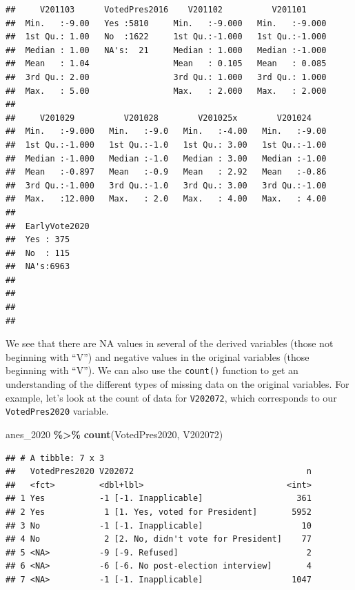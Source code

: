 \documentclass[
]{krantz}
\makeatletter
\newenvironment{Shaded}{\begin{snugshade}}{\end{snugshade}}
\newcommand{\FunctionTok}[1]{\textcolor[rgb]{0.27,0.27,0.27}{\textbf{#1}}}
\newcommand{\NormalTok}[1]{#1}
\newcommand{\SpecialCharTok}[1]{\textcolor[rgb]{0.43,0.43,0.43}{\textbf{#1}}}
\newenvironment{kframe}{%
\medskip{}
\setlength{\fboxsep}{.8em}
 \def\at@end@of@kframe{}%
 \ifinner\ifhmode%
  \def\at@end@of@kframe{\end{minipage}}%
  \begin{minipage}{\columnwidth}%
 \fi\fi%
 \def\FrameCommand##1{\hskip\@totalleftmargin \hskip-\fboxsep
 \colorbox{shadecolor}{##1}\hskip-\fboxsep
     \hskip-\linewidth \hskip-\@totalleftmargin \hskip\columnwidth}%
 \MakeFramed {\advance\hsize-\width
   \@totalleftmargin\z@ \linewidth\hsize
   \@setminipage}}%
 {\par\unskip\endMakeFramed%
 \at@end@of@kframe}
\renewenvironment{Shaded}{\begin{kframe}}{\end{kframe}}
\makeatother
\begin{document}
\begin{verbatim}
##     V201103      VotedPres2016    V201102          V201101      
##  Min.   :-9.00   Yes :5810     Min.   :-9.000   Min.   :-9.000  
##  1st Qu.: 1.00   No  :1622     1st Qu.:-1.000   1st Qu.:-1.000  
##  Median : 1.00   NA's:  21     Median : 1.000   Median :-1.000  
##  Mean   : 1.04                 Mean   : 0.105   Mean   : 0.085  
##  3rd Qu.: 2.00                 3rd Qu.: 1.000   3rd Qu.: 1.000  
##  Max.   : 5.00                 Max.   : 2.000   Max.   : 2.000  
##                                                                 
##     V201029          V201028        V201025x        V201024     
##  Min.   :-9.000   Min.   :-9.0   Min.   :-4.00   Min.   :-9.00  
##  1st Qu.:-1.000   1st Qu.:-1.0   1st Qu.: 3.00   1st Qu.:-1.00  
##  Median :-1.000   Median :-1.0   Median : 3.00   Median :-1.00  
##  Mean   :-0.897   Mean   :-0.9   Mean   : 2.92   Mean   :-0.86  
##  3rd Qu.:-1.000   3rd Qu.:-1.0   3rd Qu.: 3.00   3rd Qu.:-1.00  
##  Max.   :12.000   Max.   : 2.0   Max.   : 4.00   Max.   : 4.00  
##                                                                 
##  EarlyVote2020
##  Yes : 375    
##  No  : 115    
##  NA's:6963    
##               
##               
##               
## 
\end{verbatim}

We see that there are NA values in several of the derived variables (those not beginning with ``V'') and negative values in the original variables (those beginning with ``V''). We can also use the \texttt{count()} function to get an understanding of the different types of missing data on the original variables. For example, let's look at the count of data for \texttt{V202072}, which corresponds to our \texttt{VotedPres2020} variable.

\begin{Shaded}
\begin{Highlighting}[]
\NormalTok{anes\_2020 }\SpecialCharTok{\%\textgreater{}\%}
  \FunctionTok{count}\NormalTok{(VotedPres2020, V202072)}
\end{Highlighting}
\end{Shaded}

\begin{verbatim}
## # A tibble: 7 x 3
##   VotedPres2020 V202072                                   n
##   <fct>         <dbl+lbl>                             <int>
## 1 Yes           -1 [-1. Inapplicable]                   361
## 2 Yes            1 [1. Yes, voted for President]       5952
## 3 No            -1 [-1. Inapplicable]                    10
## 4 No             2 [2. No, didn't vote for President]    77
## 5 <NA>          -9 [-9. Refused]                          2
## 6 <NA>          -6 [-6. No post-election interview]       4
## 7 <NA>          -1 [-1. Inapplicable]                  1047
\end{verbatim}
\end{document}
